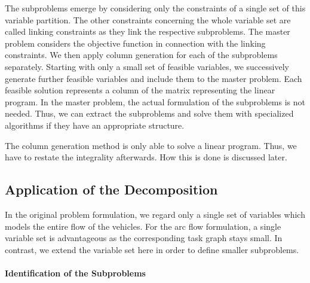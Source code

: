 The subproblems emerge by considering only the constraints of a single set of this variable partition. The other constraints concerning the whole variable set are called linking constraints as they link the respective subproblems. The master problem considers the objective function in connection with the linking constraints. We then apply column generation for each of the subproblems separately. Starting with only a small set of feasible variables, we successively generate further feasible variables and include them to the master problem. Each feasible solution represents a column of the matrix representing the linear program. In the master problem, the actual formulation of the subproblems is not needed. Thus, we can extract the subproblems and solve them with specialized algorithms if they have an appropriate structure.

The column generation method is only able to solve a linear program. Thus, we have to restate the integrality afterwards. How this is done is discussed later.


\subsection{Application of the Decomposition}

In the original problem formulation, we regard only a single set of variables which models the entire flow of the vehicles. For the arc flow formulation, a single variable set is advantageous as the corresponding task graph stays small. In contrast, we extend the variable set here in order to define smaller subproblems.

\paragraph{Identification of the Subproblems} \parfill

